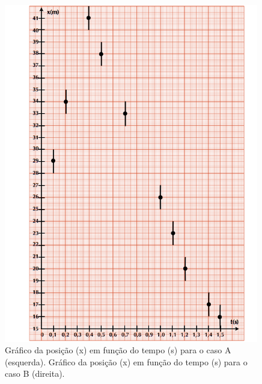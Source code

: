 \begin{figure}[t]
\begin{minipage}{\textwidth}
\begin{minipage}[t]{0.47\textwidth}
\begin{center}
 \includegraphics*[width=0.99\textwidth]{fig/Plot2}
     \end{center}
   \end{minipage}
 \end{minipage}
\caption{\label{fig:plots}  Gráfico da posição (x) em função do tempo (s) para o caso A (esquerda). Gráfico da posição (x) em função do tempo (s) para o caso B (direita).}
\end{figure} 

